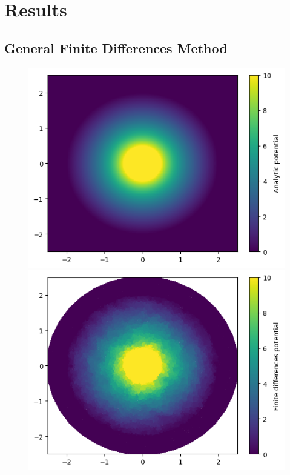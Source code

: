 \documentclass{PoS}
\begin{document}

\section{Results}
\subsection{General Finite Differences Method}
\begin{figure}[hbt]
\begin{minipage}{0.32\linewidth}
    \centering
    \includegraphics[width=\linewidth]{Figures/GFDM/Coax_Analytic.png}
\end{minipage}
\hfill
\begin{minipage}{0.32\linewidth}
    \centering
    \includegraphics[width=\linewidth]{Figures/GFDM/Coax_GFDM.png}

\end{minipage}
\end{figure}
\end{document}
